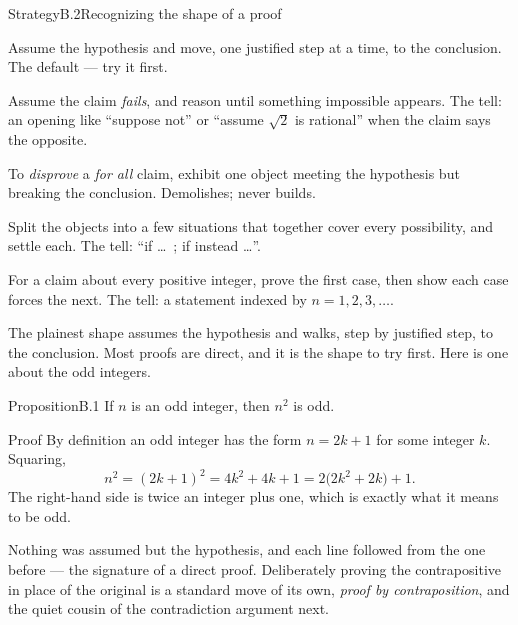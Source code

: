 \documentclass[a4paper,12pt,oneside]{memoir}
\begin{document}
\begin{envstrategy}{Strategy}{B.2}{Recognizing the shape of a proof}
\begin{bulletsteps}
  \item {} Assume the hypothesis and move, one justified step at a time, to the conclusion. The default — try it first.
  \item {} Assume the claim \emph{fails}, and reason until something impossible appears. The tell: an opening like “suppose not” or “assume \(\sqrt{2}\) is rational” when the claim says the opposite.
  \item {} To \emph{disprove} a \emph{for all} claim, exhibit one object meeting the hypothesis but breaking the conclusion. Demolishes; never builds.
  \item {} Split the objects into a few situations that together cover every possibility, and settle each. The tell: “if …\ ; if instead …”.
  \item {} For a claim about every positive integer, prove the first case, then show each case forces the next. The tell: a statement indexed by \(n = 1, 2, 3, \ldots\).
\end{bulletsteps}
\end{envstrategy}

 The plainest shape assumes the hypothesis and walks, step by justified step, to the conclusion. Most proofs are direct, and it is the shape to try first. Here is one about the odd integers.

\begin{envproposition}{Proposition}{B.1}{}
If \(n\) is an odd integer, then \(n^{2}\) is odd.
\end{envproposition}

\begin{envproof}{Proof}{}{}
By definition an odd integer has the form \(n = 2k + 1\) for some integer \(k\). Squaring,
\[ n^{2} = (2k + 1)^{2} = 4k^{2} + 4k + 1 = 2\bigl(2k^{2} + 2k\bigr) + 1. \]
The right-hand side is twice an integer plus one, which is exactly what it means to be odd. \qedmark
\end{envproof}

Nothing was assumed but the hypothesis, and each line followed from the one before — the signature of a direct proof. Deliberately proving the contrapositive in place of the original is a standard move of its own, \emph{proof by contraposition}, and the quiet cousin of the contradiction argument next.
\end{document}
